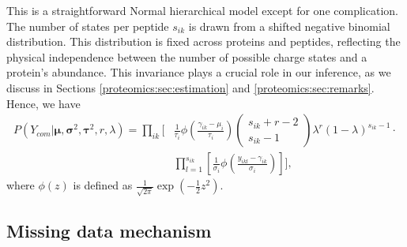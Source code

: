 This is a straightforward Normal hierarchical model except for one complication.
%
The number of states per peptide $s_{ik}$ is drawn from a shifted negative binomial distribution.
This distribution is fixed across proteins and peptides, reflecting the physical independence between the number of possible charge states and a protein's abundance.
This invariance plays a crucial role in our inference, as we discuss in Sections \ref{proteomics:sec:estimation} and \ref{proteomics:sec:remarks}.
Hence, we have
\begin{align}
\label{proteomics:eq:complete_data_likelihood}
P(Y_{com} | \bm \mu, \bm \sigma^2, \bm \tau^2, r, \lambda) =
\prod_{ik} \Bigg[& \frac{1}{\tau_i} \phi\left( \frac{\gamma_{ik} - \mu_i}{\tau_i} \right)
\begin{pmatrix} s_{ik} + r - 2 \\ s_{ik} - 1 \end{pmatrix} \lambda^{r} (1 - \lambda)^{s_{ik} - 1} \cdot \\
\nonumber
& \prod_{l=1}^{s_{ik}} \left[ \frac{1}{\sigma_i} \phi\left( \frac{y_{ikl} -  \gamma_{ik}}{\sigma_i} \right) \right] \Bigg],
\end{align}
where $\phi(z)$ is defined as $\frac{1}{\sqrt{2 \pi}} \exp\left( -\frac{1}{2} z^2 \right)$.



\subsection{Missing data mechanism}
\label{proteomics:sec:mdm}

